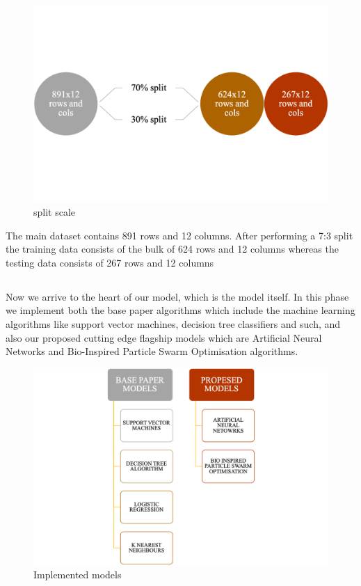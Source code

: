 \documentclass[12pt]{article}
\newcommand{\nd}{\noindent}
\newcommand{\subsize}{\fontsize{14pt}{12pt}\selectfont}
\begin{document}
\begin{center}
\begin{figure}[h]
\centerline{\includegraphics[scale=.55]{split.png}}
\caption{split scale}
\end{figure}
\end{center}

\nd The main dataset contains 891 rows and 12 columns. After performing a 7:3 split the training data consists of the bulk of 624 rows and 12 columns whereas the testing data consists of 267 rows and 12 columns 

\newpage
\subsection{\textbf{\subsize{MODEL FITTING AND TESTING}}}
Now we arrive to the heart of our model, which is the model itself. In this phase we implement both the base paper algorithms which include the machine learning algorithms like support vector machines, decision tree classifiers and such, and also our proposed cutting edge flagship models which are Artificial Neural Networks and Bio-Inspired Particle Swarm Optimisation algorithms. 

\begin{center}
\begin{figure}[h]
\centerline{\includegraphics[scale=.75]{models.png}}
\caption{Implemented models}
\end{figure}
\end{center}
\end{document}
